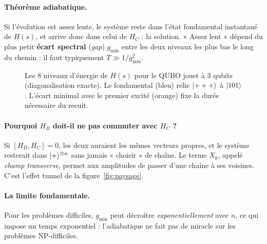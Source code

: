 \paragraph{Théorème adiabatique.} Si l'évolution est assez lente, le système reste dans l'état fondamental instantané de $H(s)$, et arrive donc dans celui de $H_C$ : la solution. « Assez lent » dépend du plus petit \textbf{écart spectral} (\emph{gap}) $g_{\min}$ entre les deux niveaux les plus bas le long du chemin : il faut typiquement $T\gg1/g_{\min}^2$.

\begin{figure}[htbp]
\centering

\caption{Les 8 niveaux d'énergie de $H(s)$ pour le QUBO jouet à 3 qubits (diagonalisation exacte). Le fondamental (bleu) relie $\lvert +++\rangle$ à $\lvert 101\rangle$. L'écart minimal avec le premier excité (orange) fixe la durée nécessaire du recuit.}\label{fig:spectre}
\end{figure}

\paragraph{Pourquoi $H_B$ doit-il ne pas commuter avec $H_C$ ?} Si $[H_B,H_C]=0$, les deux auraient les mêmes vecteurs propres, et le système resterait dans $\lvert +\rangle^{\otimes n}$ sans jamais « choisir » de chaîne. Le terme $X_k$, appelé \emph{champ transverse}, permet aux amplitudes de passer d'une chaîne à ses voisines. C'est l'effet tunnel de la figure~\ref{fig:paysage}.

\paragraph{La limite fondamentale.} Pour les problèmes difficiles, $g_{\min}$ peut décroître \emph{exponentiellement} avec $n$, ce qui impose un temps exponentiel : l'adiabatique ne fait pas de miracle sur les problèmes NP-difficiles.

